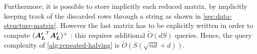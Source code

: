 Furthermore, it is possible to store implicitly each reduced matrix, by
implicitly keeping track of the discarded rows through a string as shown in
\autoref{sec:data-structure-matrix}. However the last matrix has to be
explicitly written in order to compute $(\boldsymbol{A_L'}^T \boldsymbol{A_L'})^+$ : this
requires additional $\tilde{O}(dS)$ queries. Hence, the query complexity of
\autoref{alg:repeated-halving} is $\tilde{O} (S(\sqrt{nd} + d))$.

